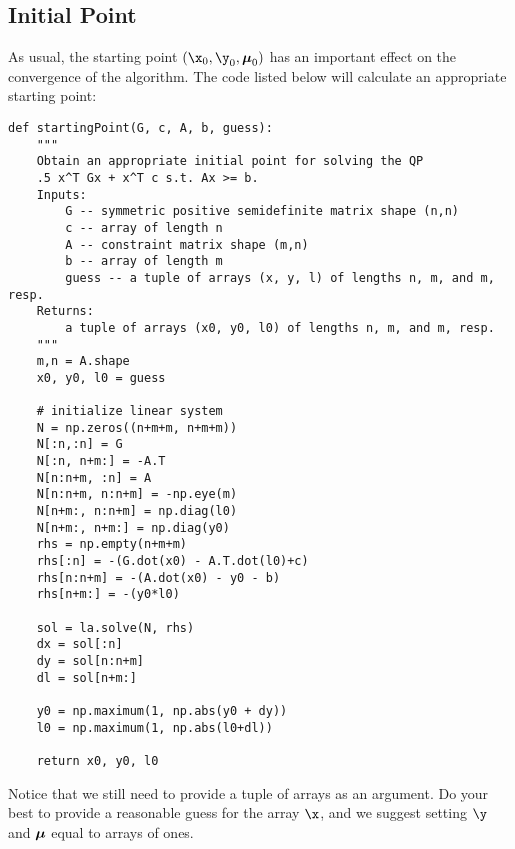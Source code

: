 \subsection*{Initial Point}
As usual, the starting point $(\x_0, \y_0, \Mu_0)$ has an important effect on the convergence of the algorithm.
The code listed below will calculate an appropriate starting point:
\begin{lstlisting}
def startingPoint(G, c, A, b, guess):
    """
    Obtain an appropriate initial point for solving the QP
    .5 x^T Gx + x^T c s.t. Ax >= b.
    Inputs:
        G -- symmetric positive semidefinite matrix shape (n,n)
        c -- array of length n
        A -- constraint matrix shape (m,n)
        b -- array of length m
        guess -- a tuple of arrays (x, y, l) of lengths n, m, and m, resp.
    Returns:
        a tuple of arrays (x0, y0, l0) of lengths n, m, and m, resp.
    """
    m,n = A.shape
    x0, y0, l0 = guess

    # initialize linear system
    N = np.zeros((n+m+m, n+m+m))
    N[:n,:n] = G
    N[:n, n+m:] = -A.T
    N[n:n+m, :n] = A
    N[n:n+m, n:n+m] = -np.eye(m)
    N[n+m:, n:n+m] = np.diag(l0)
    N[n+m:, n+m:] = np.diag(y0)
    rhs = np.empty(n+m+m)
    rhs[:n] = -(G.dot(x0) - A.T.dot(l0)+c)
    rhs[n:n+m] = -(A.dot(x0) - y0 - b)
    rhs[n+m:] = -(y0*l0)

    sol = la.solve(N, rhs)
    dx = sol[:n]
    dy = sol[n:n+m]
    dl = sol[n+m:]

    y0 = np.maximum(1, np.abs(y0 + dy))
    l0 = np.maximum(1, np.abs(l0+dl))

    return x0, y0, l0
\end{lstlisting}
Notice that we still need to provide a tuple of arrays  as an argument.
Do your best to provide a reasonable guess for the array $\x$, and we suggest setting $\y$ and $\boldsymbol{\mu}$ equal to arrays of ones.

